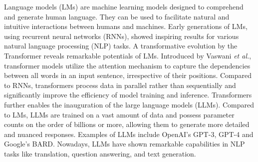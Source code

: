 %


Language models (LMs) are machine learning models designed to comprehend and generate human language. They can be used to facilitate natural and intuitive interactions between humans and machines. 
Early generations of LMs, using recurrent neural networks (RNNs),  showed inspiring results for various natural language processing (NLP) tasks.  
A transformative evolution by the Transformer \cite{vaswani2017attention} reveals remarkable potentials of LMs.
Introduced by Vaswani \textit{et al.}, transformer
models utilize the attention mechanism to capture the dependencies between all words in an input sentence, irrespective of their positions. Compared to RNNs, transformers process data in parallel rather than sequentially and significantly improve the efficiency of model training and inference. %
Transformers further enables the inauguration of the large language models (LLMs).
Compared to LMs, LLMs are trained on a vast amount of data and possess parameter counts on the order of billions or more, allowing them to generate more detailed and nuanced responses. Examples of LLMs include OpenAI's GPT-3, GPT-4 and Google's BARD. Nowadays, LLMs have shown remarkable capabilities in NLP tasks like translation, question answering, and text generation.



